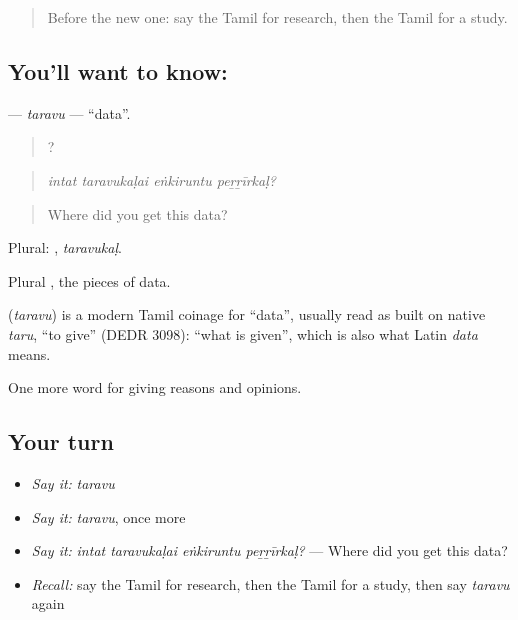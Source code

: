 \label{lesson:TA-C362-taravu}



\begin{quote}
Before the new one: say the Tamil for research, then the Tamil for a study.
\end{quote}

\subsection*{You'll want to know: }
\textbf{} — \emph{taravu} — \textquotedblleft{}data\textquotedblright{}.

\begin{quote}
   ?
\end{quote}

\begin{quote}
\emph{intat taravukaḷai eṅkiruntu peṟṟīrkaḷ?}
\end{quote}

\begin{quote}
Where did you get this data?
\end{quote}

Plural: , \emph{taravukaḷ}.

Plural , the pieces of data.

\begin{cousinweb}
\textbf{} (\emph{taravu}) is a modern Tamil coinage for \textquotedblleft{}data\textquotedblright{}, usually read as built on native \emph{taru}, \textquotedblleft{}to give\textquotedblright{} (DEDR 3098): \textquotedblleft{}what is given\textquotedblright{}, which is also what Latin \emph{data} means.
\end{cousinweb}

\begin{grammarlens}[title={What you've built}]
One more word for giving reasons and opinions.
\end{grammarlens}

\subsection*{Your turn}
\begin{itemize}
\raggedright
  \item \emph{Say it:} \emph{taravu}
  \item \emph{Say it:} \emph{taravu}, once more
  \item \emph{Say it:} \emph{intat taravukaḷai eṅkiruntu peṟṟīrkaḷ?} — Where did you get this data?
  \item \emph{Recall:} say the Tamil for research, then the Tamil for a study, then say \emph{taravu} again
\end{itemize}

